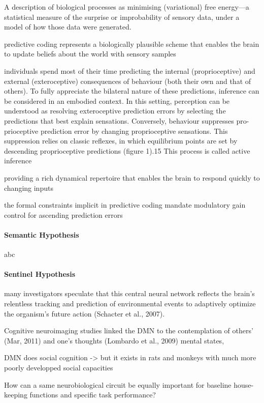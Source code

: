 \documentclass{article} %
\begin{document}
A description of biological processes as minimising (variational) free energy—a statistical measure of the surprise or improbability of sensory data, under a model of how those data were generated.

predictive coding represents a biologically plausible scheme that enables the brain to update beliefs about the world with sensory samples

 individuals spend most of their time predicting the internal (proprioceptive) and external (exteroceptive) consequences of behaviour (both their own and that of others). To fully appreciate the bilateral nature of these predictions, inference can be considered in an embodied context. In this setting, perception can be understood as resolving exteroceptive prediction errors by selecting the predictions that best explain sensations. Conversely, behaviour suppresses pro- prioceptive prediction error by changing proprioceptive sensations. This suppression relies on classic reflexes, in which equilibrium points are set by descending proprioceptive predictions (figure 1).15 This process is called active inference

providing a rich dynamical repertoire that enables the brain to respond quickly to changing inputs

the formal constraints implicit in predictive coding mandate modulatory gain control for ascending prediction errors




\paragraph{Semantic Hypothesis}
abc

\paragraph{Sentinel Hypothesis}
many investigators speculate that this central neural network reflects the brain’s relentless tracking and prediction of environmental events to adaptively optimize the organism's future action (Schacter et al., 2007).

Cognitive neuroimaging studies linked the DMN to the contemplation of others’ (Mar, 2011) and one’s thoughts (Lombardo et al., 2009) mental states, 

DMN does social cognition -> but it exists in rats and monkeys with much more poorly developped social capacities

How can a same neurobiological circuit be equally important for baseline house-keeping functions and specific task performance?
\end{document}
